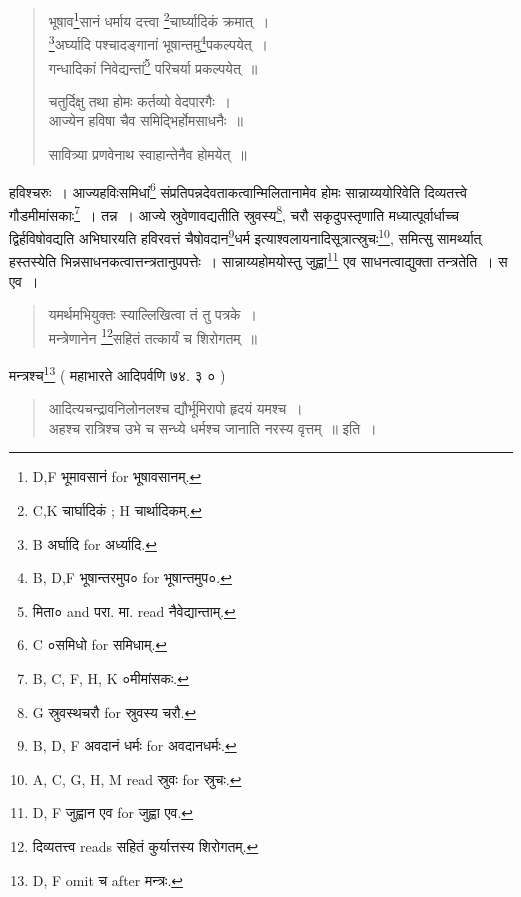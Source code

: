 \documentclass[11pt, openany]{book}
\begin{document}
\begin{quote}
{\vy भूषाव\renewcommand{\thefootnote}{1}\footnote{D,F भूमावसानं for भूषावसानम्.}सानं धर्माय दत्त्वा \renewcommand{\thefootnote}{2}\footnote{C,K चार्घादिकं ; H चार्थादिकम्.}चार्घ्यादिकं क्रमात्~।\\
\renewcommand{\thefootnote}{3}\footnote{B अर्घादि for अर्ध्यादि.}अर्घ्यादि पश्चादङ्गानां भूषान्तमु\renewcommand{\thefootnote}{4}\footnote{B, D,F भूषान्तरमुप० for भूषान्तमुप०.}पकल्पयेत्~।\\
गन्धादिकां निवेद्यन्तां\renewcommand{\thefootnote}{5}\footnote{मिता० and परा. मा. read नैवेद्यान्ताम्.} परिचर्या प्रकल्पयेत्~॥

चतुर्दिक्षु तथा होमः कर्तव्यो वेदपारगैः~।\\
आज्येन हविषा चैव समिद्भिर्होमसाधनैः~॥

सावित्र्या प्रणवेनाथ स्वाहान्तेनैव होमयेत्~॥}
\end{quote}

हविश्चरुः~। आज्यहविःसमिधां\renewcommand{\thefootnote}{6}\footnote{C ०समिधो for समिधाम्.} संप्रतिपन्नदेवताकत्वान्मिलितानामेव होमः सान्नाय्ययोरिवेति दिव्यतत्त्वे गौडमीमांसकाः\renewcommand{\thefootnote}{7}\footnote{B, C, F, H, K ०मीमांसकः.}~। तन्न~। आज्ये स्रुवेणावद्यतीति स्रुवस्य\renewcommand{\thefootnote}{8}\footnote{G स्रुवस्थचरौ for स्रुवस्य चरौ.}, चरौ सकृदुपस्तृणाति मध्यात्पूर्वार्धाच्च द्विर्हविषोवद्यति अभिघारयति हविरवत्तं चैषोवदान\renewcommand{\thefootnote}{9}\footnote{B, D, F अवदानं धर्मः for अवदानधर्मः.}धर्म इत्याश्वलायनादिसूत्रात्स्रुचः\renewcommand{\thefootnote}{10}\footnote{A, C, G, H, M read स्रुवः for स्रुचः.}, समित्सु सामर्थ्यात् हस्तस्येति भिन्नसाधनकत्वात्तन्त्रतानुपपत्तेः~। सान्नाय्यहोमयोस्तु जुह्वा\renewcommand{\thefootnote}{11}\footnote{D, F जुह्वान एव for जुह्वा एव.} एव साधनत्वाद्युक्ता तन्त्रतेति~। स एव~। 

\begin{quote}
{\vy यमर्थमभियुक्तः स्याल्लिखित्वा तं तु पत्रके~।\\
मन्त्रेणानेन \renewcommand{\thefootnote}{12}\footnote{दिव्यतत्त्व reads सहितं कुर्यात्तस्य शिरोगतम्.}सहितं तत्कार्यं च शिरोगतम्~॥}
\end{quote}

\newpage
{}

मन्त्रश्च\renewcommand{\thefootnote}{1}\footnote{D, F omit च after मन्त्रः.} ( महाभारते आदिपर्वणि ७४. ३ ० ) 

\begin{quote}
{\vy आदित्यचन्द्रावनिलोनलश्च द्यौर्भूमिरापो हृदयं यमश्च~।\\
अहश्च रात्रिश्च उभे च सन्ध्ये धर्मश्च जानाति नरस्य वृत्तम्~॥} इति~।
\end{quote}
\end{document}
